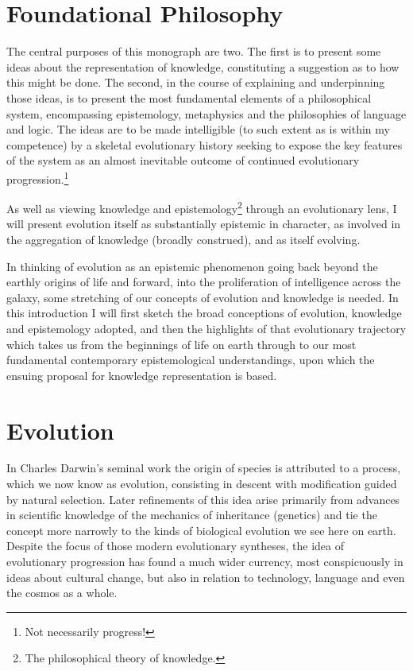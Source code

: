 \section{Foundational Philosophy}

The central purposes of this monograph are two.
The first is to present some ideas about the representation of knowledge, constituting a suggestion as to how this might be done.
The second, in the course of explaining and underpinning those ideas, is to present the most fundamental elements of a philosophical system, encompassing epistemology, metaphysics and the philosophies of language and logic. 
The ideas are to be made intelligible (to such extent as is within my competence) by a skeletal evolutionary history seeking to expose the key features of the system as an almost inevitable outcome of continued evolutionary progression.\footnote{Not necessarily progress!}

As well as viewing knowledge and epistemology\footnote{The philosophical theory of knowledge.} through an evolutionary lens, I will present evolution itself as substantially epistemic in character, as involved in the aggregation of knowledge (broadly construed), and as itself evolving.

In thinking of evolution as an epistemic phenomenon going back beyond the earthly origins of life and forward, into the proliferation of intelligence across the galaxy, some stretching of our concepts of evolution and knowledge is needed.
In this introduction I will first sketch the broad conceptions of evolution, knowledge and epistemology adopted, and then the highlights of that evolutionary trajectory which takes us from the beginnings of life on earth through to our most fundamental contemporary epistemological understandings, upon which the ensuing proposal for knowledge representation is based.

\section{Evolution}

In Charles Darwin's seminal work\cite{darwin-oos} the origin of species is attributed to a process, which we now know as evolution, consisting in descent with modification guided by natural selection.
Later refinements of this idea arise primarily from advances in scientific knowledge of the mechanics of inheritance (genetics) and tie the concept more narrowly to the kinds of biological evolution we see here on earth.
Despite the focus of those modern evolutionary syntheses, the idea of evolutionary progression has found a much wider currency, most conspicuously in ideas about cultural change, but also in relation to technology, language and even the cosmos as a whole. 

